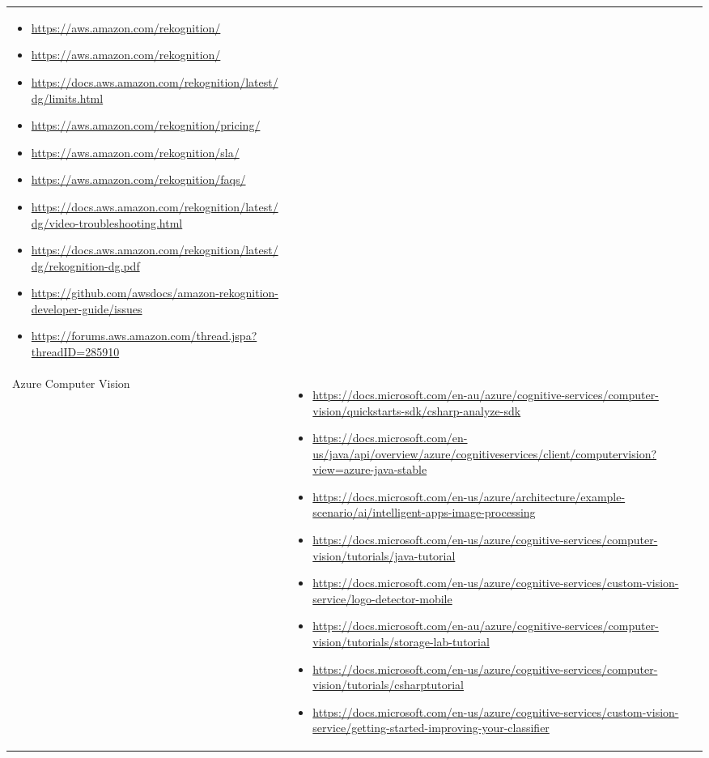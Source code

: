 {\begin{longtable}{p{.2\linewidth}|p{.725\linewidth}}
\begin{itemize}[label=,leftmargin=10pt,topsep=0pt,partopsep=0pt,noitemsep,nolistsep,itemindent=-10pt]
\item \url{https://aws.amazon.com/rekognition/}
\item \url{https://aws.amazon.com/rekognition/}
\item \url{https://docs.aws.amazon.com/rekognition/latest/dg/limits.html}
\item \url{https://aws.amazon.com/rekognition/pricing/}
\item \url{https://aws.amazon.com/rekognition/sla/}
\item \url{https://aws.amazon.com/rekognition/faqs/}
\item \url{https://docs.aws.amazon.com/rekognition/latest/dg/video-troubleshooting.html}
\item \url{https://docs.aws.amazon.com/rekognition/latest/dg/rekognition-dg.pdf}
\item \url{https://github.com/awsdocs/amazon-rekognition-developer-guide/issues}
\item \url{https://forums.aws.amazon.com/thread.jspa?threadID=285910}
    \end{itemize}\\
    Azure Computer Vision &
    \vspace{-1.75mm}
    \begin{itemize}[label=,leftmargin=10pt,topsep=0pt,partopsep=0pt,noitemsep,nolistsep,itemindent=-10pt]
\item \url{https://docs.microsoft.com/en-au/azure/cognitive-services/computer-vision/quickstarts-sdk/csharp-analyze-sdk}
\item \url{https://docs.microsoft.com/en-us/java/api/overview/azure/cognitiveservices/client/computervision?view=azure-java-stable}
\item \url{https://docs.microsoft.com/en-us/azure/architecture/example-scenario/ai/intelligent-apps-image-processing}
\item \url{https://docs.microsoft.com/en-us/azure/cognitive-services/computer-vision/tutorials/java-tutorial}
\item \url{https://docs.microsoft.com/en-us/azure/cognitive-services/custom-vision-service/logo-detector-mobile}
\item \url{https://docs.microsoft.com/en-au/azure/cognitive-services/computer-vision/tutorials/storage-lab-tutorial}
\item \url{https://docs.microsoft.com/en-us/azure/cognitive-services/computer-vision/tutorials/csharptutorial}
\item \url{https://docs.microsoft.com/en-us/azure/cognitive-services/custom-vision-service/getting-started-improving-your-classifier}

\end{itemize}
\end{longtable}}
